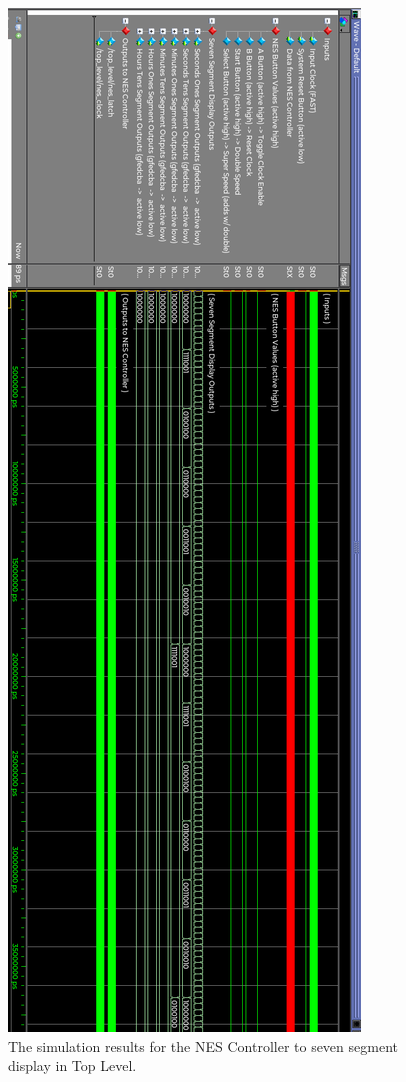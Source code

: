 \documentclass[a4paper]{article}
\begin{document}
\begin{figure}[h]
  \centering
    \includegraphics[height=0.98\textheight]{sims/top_level_clock_sim_1.png}
	\caption{The simulation results for the NES Controller to seven segment display in Top Level.}
    \label{fig:top-level-sim}
\end{figure}
\end{document}
